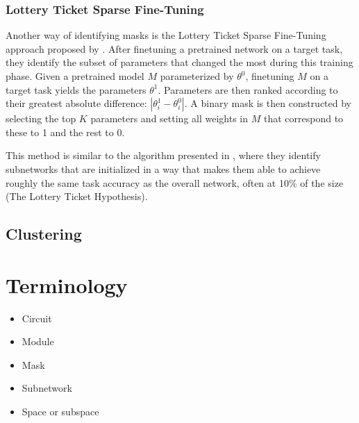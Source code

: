 \documentclass[11pt]{article}
\begin{document}
\subsubsection{Lottery Ticket Sparse Fine-Tuning}
Another way of identifying masks is the Lottery Ticket Sparse Fine-Tuning approach proposed by \citet{ansell-etal-2022-composable}. After finetuning a pretrained network on a target task, they identify the subset of parameters that changed the most during this training phase. Given a pretrained model $M$ parameterized by $\theta^0$, finetuning $M$ on a target task yields the parameters $\theta^1$. Parameters are then ranked according to their greatest absolute difference: $|\theta^1_i - \theta^0_i|$. A binary mask is then constructed by selecting the top $K$ parameters and setting all weights in $M$ that correspond to these to 1 and the rest to 0. 

This method is similar to the algorithm presented in \citet{frankle2018the}, where they identify subnetworks that are initialized in a way that makes them able to achieve roughly the same task accuracy as the overall network, often at 10\% of the size (The Lottery Ticket Hypothesis).

\subsection{Clustering}
\citet{watanabe2019interpreting, casper2022graphical}

\section{Terminology}
\begin{itemize}
	\item Circuit
	\item Module
	\item Mask
	\item Subnetwork
	\item Space or subspace
\end{itemize}


\newpage

\end{document}
